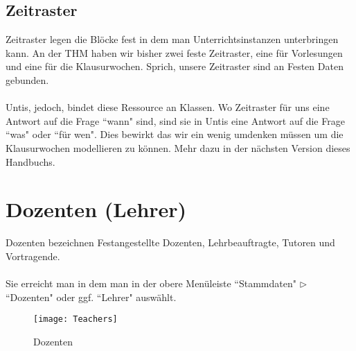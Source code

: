 \subsection{Zeitraster}

Zeitraster legen die Blöcke fest in dem man Unterrichtsinstanzen unterbringen kann. An der THM haben wir bisher zwei feste Zeitraster, eine für Vorlesungen und eine für die Klausurwochen. Sprich, unsere Zeitraster sind an Festen Daten gebunden.\\
\\
Untis, jedoch, bindet diese Ressource an Klassen. Wo Zeitraster für uns eine Antwort auf die Frage ``wann" sind, sind sie in Untis eine Antwort auf die Frage ``was" oder ``für wen". Dies bewirkt das wir ein wenig umdenken müssen um die Klausurwochen modellieren zu können. Mehr dazu in der nächsten Version dieses Handbuchs.

\newpage
\section{Dozenten (Lehrer)}

Dozenten bezeichnen Festangestellte Dozenten, Lehrbeauftragte, Tutoren und Vortragende.\\
\\
Sie erreicht man in dem man in der obere Menüleiste ``Stammdaten" $\triangleright$ ``Dozenten" oder ggf. ``Lehrer" auswählt.

\begin{figure}[h]
	\texttt{[image: Teachers]}
	\vspace{-15pt}
	\caption{Dozenten}
	\label{fig:teachers}
\end{figure}

